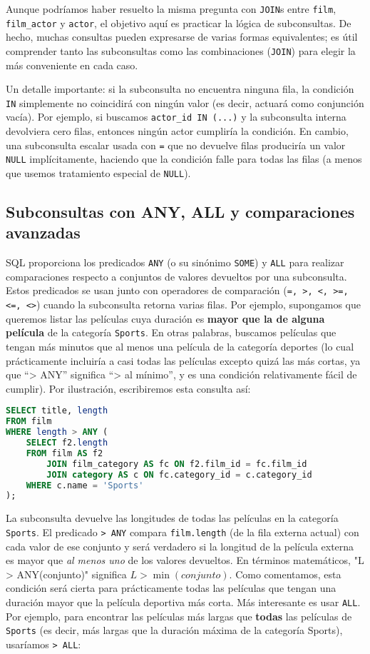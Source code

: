 \documentclass[12pt,a4paper]{article}
\begin{document}
Aunque podríamos haber resuelto la misma pregunta con \texttt{JOIN}s entre \texttt{film}, \texttt{film\_actor} y \texttt{actor}, el objetivo aquí es practicar la lógica de subconsultas.
%
De hecho, muchas consultas pueden expresarse de varias formas equivalentes; es útil comprender tanto las subconsultas como las combinaciones (\texttt{JOIN}) para elegir la más conveniente en cada caso.


Un detalle importante: si la subconsulta no encuentra ninguna fila, la condición \texttt{IN} simplemente no coincidirá con ningún valor (es decir, actuará como conjunción vacía).
%
Por ejemplo, si buscamos \texttt{actor\_id IN (...)} y la subconsulta interna devolviera cero filas, entonces ningún actor cumpliría la condición.
%
En cambio, una subconsulta escalar usada con \texttt{=} que no devuelve filas produciría un valor \texttt{NULL} implícitamente, haciendo que la condición falle para todas las filas (a menos que usemos tratamiento especial de \texttt{NULL}). 


\subsection*{Subconsultas con ANY, ALL y comparaciones avanzadas} SQL proporciona los predicados \texttt{ANY} (o su sinónimo \texttt{SOME}) y \texttt{ALL} para realizar comparaciones respecto a conjuntos de valores devueltos por una subconsulta.
%
Estos predicados se usan junto con operadores de comparación (\texttt{=, >, <, >=, <=, <>}) cuando la subconsulta retorna varias filas.
%
Por ejemplo, supongamos que queremos listar las películas cuya duración es \textbf{mayor que la de alguna película} de la categoría \texttt{Sports}.
%
En otras palabras, buscamos películas que tengan más minutos que al menos una película de la categoría deportes (lo cual prácticamente incluiría a casi todas las películas excepto quizá las más cortas, ya que “> ANY” significa “> al mínimo”, y es una condición relativamente fácil de cumplir).
%
Por ilustración, escribiremos esta consulta así: 


\begin{lstlisting}[language=SQL]
SELECT title, length
FROM film
WHERE length > ANY (
	SELECT f2.length
	FROM film AS f2
		JOIN film_category AS fc ON f2.film_id = fc.film_id
		JOIN category AS c ON fc.category_id = c.category_id
	WHERE c.name = 'Sports'
);
\end{lstlisting}


La subconsulta devuelve las longitudes de todas las películas en la categoría \texttt{Sports}.
%
El predicado \texttt{> ANY} compara \texttt{film.length} (de la fila externa actual) con cada valor de ese conjunto y será verdadero si la longitud de la película externa es mayor que \textit{al menos uno} de los valores devueltos.
%
En términos matemáticos, "L > ANY(conjunto)" significa $L > \min(conjunto)$.
%
Como comentamos, esta condición será cierta para prácticamente todas las películas que tengan una duración mayor que la película deportiva más corta.
%
Más interesante es usar \texttt{ALL}.
%
Por ejemplo, para encontrar las películas más largas que \textbf{todas} las películas de \texttt{Sports} (es decir, más largas que la duración máxima de la categoría Sports), usaríamos \texttt{> ALL}: 
\end{document}
